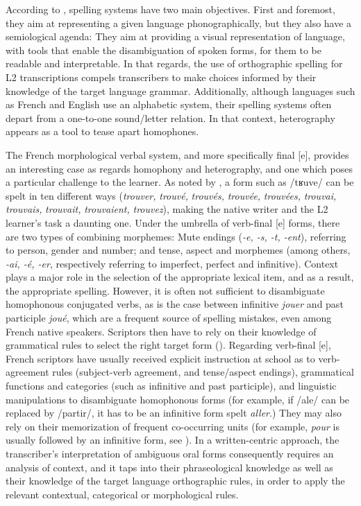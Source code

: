 \documentclass[output=paper,colorlinks,citecolor=brown,modfonts,nonflat]{../langscibook}
\begin{document}
According to \citet{Jaffré2006}, spelling systems have two main objectives. First and foremost, they aim at representing a given language phonographically, but they also have a semiological agenda: They aim at providing a visual representation of language, with tools that enable the disambiguation of spoken forms, for them to be readable and interpretable. In that regards, the use of orthographic spelling for L2 transcriptions compels transcribers to make choices informed by their knowledge of the target language grammar. Additionally, although languages such as French and English use an alphabetic system, their spelling systems often depart from a one-to-one sound/letter relation. In that context, heterography appears as a tool to tease apart homophones. 

The French morphological verbal system, and more specifically final [e], provides an interesting case as regards homophony and heterography, and one which poses a particular challenge to the learner. As noted by \citet{BrissaudEtAl2006}, a form such as /tʁuve/ can be spelt in ten different ways (\textit{trouver,} \textit{trouvé,} \textit{trouvés,} \textit{trouvée,} \textit{trouvées,} \textit{trouvai,} \textit{trouvais,} \textit{trouvait,} \textit{trouvaient,} \textit{trouvez}), making the native writer and the L2 learner’s task a daunting one. Under the umbrella of verb-final [e] forms, there are two types of combining morphemes: Mute endings (\textit{{}-e, -s, -t, -ent}), referring to person, gender and number; and tense, aspect and morphemes (among others, \textit{{}-ai, -é, -er}, respectively referring to imperfect, perfect and infinitive). Context plays a major role in the selection of the appropriate lexical item, and as a result, the appropriate spelling. However, it is often not sufficient to disambiguate homophonous conjugated verbs, as is the case between infinitive \textit{jouer} and past participle \textit{joué}, which are a frequent source of spelling mistakes, even among French native speakers. Scriptors then have to rely on their knowledge of grammatical rules to select the right target form (\citealt{DavidEtAl2006,BrissaudEtAl2006}). Regarding verb-final [e], French scriptors have usually received explicit instruction at school as to verb-agreement rules (subject-verb agreement, and tense/aspect endings), grammatical functions and categories (such as infinitive and past participle), and linguistic manipulations to disambiguate homophonous forms (for example, if /ale/ can be replaced by /partir/, it has to be an infinitive form spelt \textit{aller}.) They may also rely on their memorization of frequent co-occurring units (for example, \textit{pour} is usually followed by an infinitive form, see \citealt[78]{BrissaudEtAl2006}). In a written-centric approach, the transcriber’s interpretation of ambiguous oral forms consequently requires an analysis of context, and it taps into their phraseological knowledge as well as their knowledge of the target language orthographic rules, in order to apply the relevant contextual, categorical or morphological rules.
\end{document}
